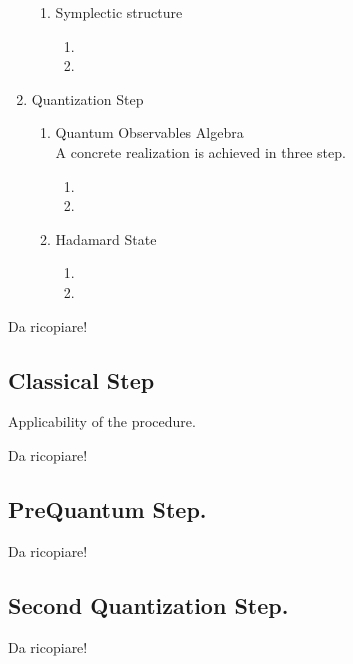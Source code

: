 \documentclass[Main]{subfiles}
\begin{document}
\begin{enumerate}
\begin{enumerate}
   				 \item Symplectic structure
   				   	\begin{enumerate}
   						\item
   						\item
   					\end{enumerate}
   			\end{enumerate}
  
   		\item Quantization Step
   		   	\begin{enumerate}
   				\item Quantum Observables Algebra\\
   					A concrete realization is achieved in three step.
   					\begin{enumerate}
   						\item
   						\item
   					\end{enumerate}
   					
   				\item Hadamard State
   				   	\begin{enumerate}
   						\item
   						\item
   					\end{enumerate}
   				 
   			\end{enumerate}
 \end{enumerate}
		\begin{Warning}
			Da ricopiare!
		\end{Warning}

	\subsection{Classical Step}
	Applicability of the procedure.
		\begin{Warning}
			Da ricopiare!
		\end{Warning}
	\subsection{PreQuantum Step.}
		\begin{Warning}
			Da ricopiare!
		\end{Warning}
	\subsection{Second Quantization Step.}
		\begin{Warning}
			Da ricopiare!
		\end{Warning}
\end{document}
